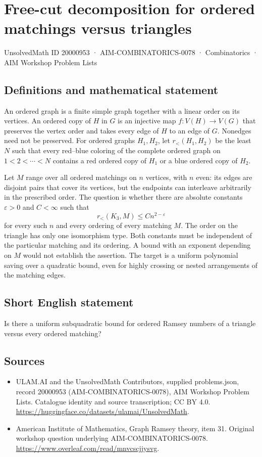 \documentclass[11pt,a4paper]{article}
\begin{document}
\section*{Free-cut decomposition for ordered matchings versus triangles}\label{20000953}
{\small UnsolvedMath ID 20000953 · AIM-COMBINATORICS-0078 · Combinatorics · AIM Workshop Problem Lists}
\subsection{Definitions and mathematical statement}
An ordered graph is a finite simple graph together with a linear order
on its vertices. An ordered copy of $H$ in $G$ is an injective map
$f:V(H)\to V(G)$ that preserves the vertex order and takes every edge
of $H$ to an edge of $G$. Nonedges need not be preserved.
For ordered graphs $H_1,H_2$, let $r_<(H_1,H_2)$ be the least $N$
such that every red--blue coloring of the complete ordered graph on
$1<2<\cdots<N$ contains a red ordered copy of $H_1$ or a blue ordered
copy of $H_2$.

Let $M$ range over all ordered matchings on $n$ vertices, with $n$
even: its edges are disjoint pairs that cover its vertices, but the
endpoints can interleave arbitrarily in the prescribed order.
The question is whether there are absolute constants $\varepsilon>0$
and $C<\infty$ such that
\[
                       r_<(K_3,M)\le Cn^{2-\varepsilon}
\]
for every such $n$ and every ordering of every matching $M$.
The order on the triangle has only one isomorphism type.
Both constants must be independent of the particular matching and its
ordering. A bound with an exponent depending on $M$ would not establish
the assertion. The target is a uniform polynomial saving over a
quadratic bound, even for highly crossing or nested arrangements of
the matching edges.
\subsection{Short English statement}
Is there a uniform subquadratic bound for ordered Ramsey numbers of a triangle versus every ordered matching?
\subsection{Sources}
\begin{itemize}
\item[S1] ULAM.AI and the UnsolvedMath Contributors, supplied problems.json, record 20000953 (AIM-COMBINATORICS-0078), AIM Workshop Problem Lists. Catalogue identity and source transcription; CC BY 4.0.
\url{https://huggingface.co/datasets/ulamai/UnsolvedMath}.
\item[S2] American Institute of Mathematics, Graph Ramsey theory, item 31. Original workshop question underlying AIM-COMBINATORICS-0078.
\url{https://www.overleaf.com/read/mnvcscjjysvg}.
\end{itemize}
\end{document}
